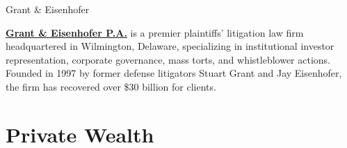 \documentclass[10pt]{article}
\begin{document}
    \begin{core}{Grant \& Eisenhofer}

      \href{https://www.gelaw.com/}{\textbf{Grant \& Eisenhofer P.A.}} is a premier plaintiffs' litigation law firm headquartered in Wilmington, Delaware, specializing in institutional investor representation, corporate governance, mass torts, and whistleblower actions. Founded in 1997 by former defense litigators Stuart Grant and Jay Eisenhofer, the firm has recovered over \$30 billion for clients.

    \end{core}

\section{Private Wealth}
\end{document}
